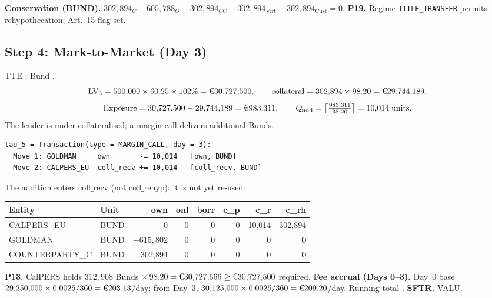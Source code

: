 \documentclass[11pt,a4paper]{article}
\newcommand{\EUR}[1]{\mbox{\texteuro#1}}
\begin{document}
\noindent\textbf{Conservation (BUND).} $302{,}894_C - 605{,}788_G + 302{,}894_{CC} + 302{,}894_{\mathrm{Virt}} - 302{,}894_{\mathrm{Cust}} = 0$. \checkmark\quad
\textbf{P19.} Regime \texttt{TITLE\_TRANSFER} permits rehypothecation; Art.~15 flag set. \checkmark

\subsection{Step 4: Mark-to-Market (Day 3)}
\label{sec:eu-step4}

TTE \EUR{60.25}; Bund \EUR{98.20}.
\[
\mathrm{LV}_3 = 500{,}000 \times 60.25 \times 102\% = \text{\EUR{30,727,500}}, \qquad
\text{collateral} = 302{,}894 \times 98.20 = \text{\EUR{29,744,189}}.
\]
\[
\text{Exposure} = 30{,}727{,}500 - 29{,}744{,}189 = \text{\EUR{983,311}}, \qquad
Q_{\mathrm{add}} = \left\lceil \tfrac{983{,}311}{98.20} \right\rceil = 10{,}014 \;\text{units}.
\]
The lender is under-collateralised; a margin call delivers additional Bunds.

\begin{lstlisting}
tau_5 = Transaction(type = MARGIN_CALL, day = 3):
  Move 1: GOLDMAN     own       -= 10,014   [own, BUND]
  Move 2: CALPERS_EU  coll_recv += 10,014   [coll_recv, BUND]
\end{lstlisting}

\noindent The addition enters $\mathrm{coll\_recv}$ (not $\mathrm{coll\_rehyp}$): it is not yet re-used.

\begin{center}\small
\begin{tabular}{l l r r r r r r}
\toprule
\textbf{Entity} & \textbf{Unit} & own & onl & borr & c\_p & c\_r & c\_rh \\
\midrule
CALPERS\_EU & BUND & 0 & 0 & 0 & 0 & 10{,}014 & 302{,}894 \\
GOLDMAN & BUND & $-615{,}802$ & 0 & 0 & 0 & 0 & 0 \\
COUNTERPARTY\_C & BUND & 302{,}894 & 0 & 0 & 0 & 0 & 0 \\
\bottomrule
\end{tabular}
\end{center}

\noindent\textbf{P13.} CalPERS holds $312{,}908$ Bunds $\times\,98.20 = \text{\EUR{30,727,566}} \geq \text{\EUR{30,727,500}}$ required. \checkmark\quad
\textbf{Fee accrual (Days 0--3).} Day~0 base $29{,}250{,}000 \times 0.0025/360 = \text{\EUR{203.13}}$/day; from Day~3, $30{,}125{,}000 \times 0.0025/360 = \text{\EUR{209.20}}$/day. Running total \EUR{818.58}.\quad
\textbf{SFTR.} VALU.
\end{document}
